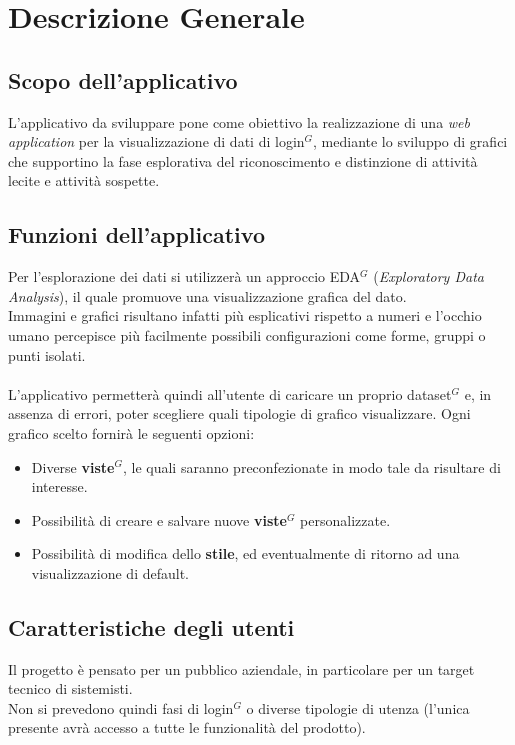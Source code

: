 \section{Descrizione Generale}
\subsection{Scopo dell'applicativo}

L'applicativo da sviluppare pone come obiettivo la realizzazione di una \textit{web application} per la visualizzazione di dati di login$^{G}$, mediante lo sviluppo di grafici che supportino la fase esplorativa del riconoscimento e distinzione di attività lecite e attività sospette.

\subsection{Funzioni dell'applicativo}

Per l'esplorazione dei dati si utilizzerà un approccio EDA$^{G}$ (\textit{Exploratory Data Analysis}), il quale promuove una visualizzazione grafica del dato.\\ 
Immagini e grafici risultano infatti più esplicativi rispetto a numeri e l'occhio umano percepisce più facilmente possibili configurazioni come forme, gruppi o punti isolati. \\ \\
L'applicativo permetterà quindi all'utente di caricare un proprio dataset$^{G}$ e, in assenza di errori, poter scegliere quali tipologie di grafico visualizzare. Ogni grafico scelto fornirà le seguenti opzioni:
\begin{itemize}
\item Diverse \textbf{viste$^{G}$}, le quali saranno preconfezionate in modo tale da risultare di interesse.
\item Possibilità di creare e salvare nuove \textbf{viste$^{G}$} personalizzate.
\item Possibilità di modifica dello \textbf{stile}, ed eventualmente di ritorno ad una visualizzazione di default.
\end{itemize}

\subsection{Caratteristiche degli utenti}

Il progetto è pensato per un pubblico aziendale, in particolare per un target tecnico di sistemisti.\\
Non si prevedono quindi fasi di login$^{G}$ o diverse tipologie di utenza (l'unica presente avrà accesso a tutte le funzionalità del prodotto).

